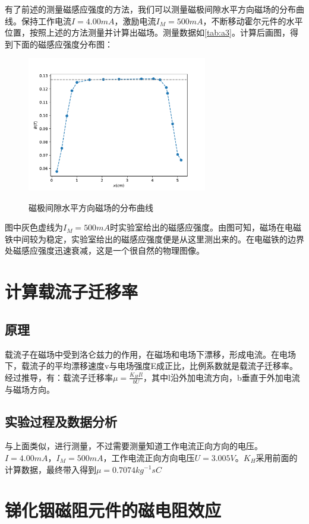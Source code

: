 \documentclass[12pt]{article}
\begin{document}
有了前述的测量磁感应强度的方法，我们可以测量磁极间隙水平方向磁场的分布曲线。保持工作电流$I=4.00mA$，激励电流$I_M=500mA$，不断移动霍尔元件的水平位置，按照上述的方法测量并计算出磁场。测量数据如\ref{tab:a3}。计算后画图，得到下面的磁感应强度分布图：

\begin{figure}[H]
    \centering
    \includegraphics[width=0.7\textwidth]{part5.pdf}
    \label{fig:3}
    \caption{磁极间隙水平方向磁场的分布曲线}
\end{figure}

图中灰色虚线为$I_M=500mA$时实验室给出的磁感应强度。由图可知，磁场在电磁铁中间较为稳定，实验室给出的磁感应强度便是从这里测出来的。在电磁铁的边界处磁感应强度迅速衰减，这是一个很自然的物理图像。

\section{计算载流子迁移率}
\subsection{原理}
载流子在磁场中受到洛仑兹力的作用，在磁场和电场下漂移，形成电流。在电场下，载流子的平均漂移速度v与电场强度E成正比，比例系数就是载流子迁移率。经过推导，有：载流子迁移率$\mu = \frac{K_H I l}{bU}$，其中l沿外加电流方向，b垂直于外加电流与磁场方向。

\subsection{实验过程及数据分析}
与上面类似，进行测量，不过需要测量知道工作电流正向方向的电压。$I=4.00mA$，$I_M=500mA$，工作电流正向方向电压$U=3.005V$。$K_H$采用前面的计算数据，最终带入得到$\mu = 0.7074 kg^{-1}sC$

\section{锑化铟磁阻元件的磁电阻效应}
\end{document}

